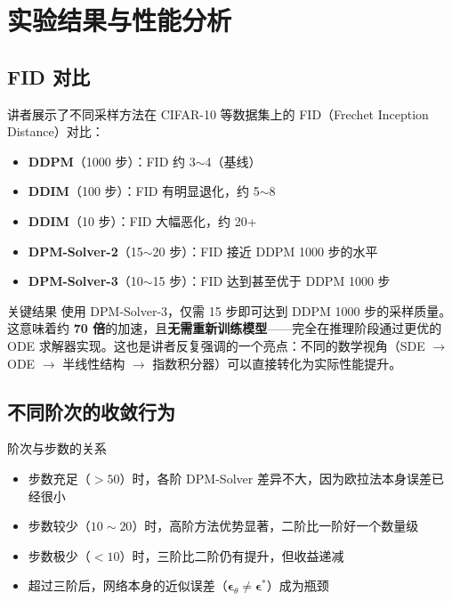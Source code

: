 \section{实验结果与性能分析}

\subsection{FID 对比}

讲者展示了不同采样方法在 CIFAR-10 等数据集上的 FID（Frechet Inception Distance）对比：

\begin{itemize}
    \item \textbf{DDPM}（1000 步）：FID 约 3$\sim$4（基线）
    \item \textbf{DDIM}（100 步）：FID 有明显退化，约 5$\sim$8
    \item \textbf{DDIM}（10 步）：FID 大幅恶化，约 20+
    \item \textbf{DPM-Solver-2}（15$\sim$20 步）：FID 接近 DDPM 1000 步的水平
    \item \textbf{DPM-Solver-3}（10$\sim$15 步）：FID 达到甚至优于 DDPM 1000 步
\end{itemize}

\begin{importantbox}{关键结果}
使用 DPM-Solver-3，仅需 15 步即可达到 DDPM 1000 步的采样质量。这意味着约 \textbf{70 倍}的加速，且\textbf{无需重新训练模型}——完全在推理阶段通过更优的 ODE 求解器实现。这也是讲者反复强调的一个亮点：不同的数学视角（SDE $\to$ ODE $\to$ 半线性结构 $\to$ 指数积分器）可以直接转化为实际性能提升。
\end{importantbox}

\subsection{不同阶次的收敛行为}

\begin{knowledgebox}{阶次与步数的关系}
\begin{itemize}
    \item 步数充足（$>50$）时，各阶 DPM-Solver 差异不大，因为欧拉法本身误差已经很小
    \item 步数较少（$10\sim 20$）时，高阶方法优势显著，二阶比一阶好一个数量级
    \item 步数极少（$<10$）时，三阶比二阶仍有提升，但收益递减
    \item 超过三阶后，网络本身的近似误差（$\boldsymbol{\epsilon}_\theta \neq \boldsymbol{\epsilon}^*$）成为瓶颈
\end{itemize}
\end{knowledgebox}

